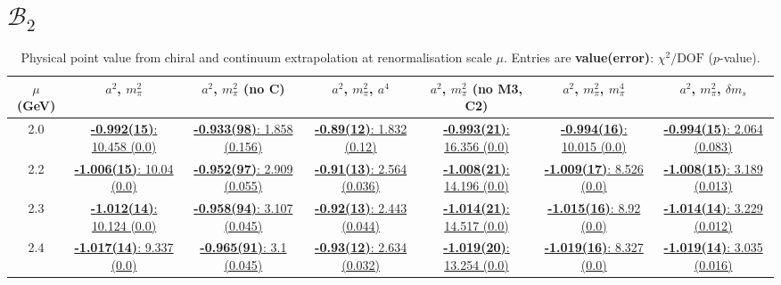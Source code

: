 \documentclass[12pt]{extarticle}
\begin{document}
\section{$\mathcal{B}_2$}
\begin{table}[h!]
\begin{center}
\begin{tabular}{|c|c|c|c|c|c|c|}
\hline
$\mu$ (GeV) & $a^2$, $m_\pi^2$& $a^2$, $m_\pi^2$ (no C)& $a^2$, $m_\pi^2$, $a^4$& $a^2$, $m_\pi^2$ (no M3, C2)& $a^2$, $m_\pi^2$, $m_\pi^4$& $a^2$, $m_\pi^2$, $\delta m_s$\\
\hline
2.0& \hyperlink{VVmAA/NPR/a2m2_20.pdf.1}{\textbf{-0.992(15)}: 10.458 (0.0)} & \hyperlink{VVmAA/NPR/a2m2noC_20.pdf.1}{\textbf{-0.933(98)}: 1.858 (0.156)} & \hyperlink{VVmAA/NPR/a2a4m2_20.pdf.1}{\textbf{-0.89(12)}: 1.832 (0.12)} & \hyperlink{VVmAA/NPR/a2m2mcut_20.pdf.1}{\textbf{-0.993(21)}: 16.356 (0.0)} & \hyperlink{VVmAA/NPR/a2m2m4_20.pdf.1}{\textbf{-0.994(16)}: 10.015 (0.0)} & \hyperlink{VVmAA/NPR/a2m2delm_20.pdf.1}{\textbf{-0.994(15)}: 2.064 (0.083)}\\
2.2& \hyperlink{VVmAA/NPR/a2m2_22.pdf.1}{\textbf{-1.006(15)}: 10.04 (0.0)} & \hyperlink{VVmAA/NPR/a2m2noC_22.pdf.1}{\textbf{-0.952(97)}: 2.909 (0.055)} & \hyperlink{VVmAA/NPR/a2a4m2_22.pdf.1}{\textbf{-0.91(13)}: 2.564 (0.036)} & \hyperlink{VVmAA/NPR/a2m2mcut_22.pdf.1}{\textbf{-1.008(21)}: 14.196 (0.0)} & \hyperlink{VVmAA/NPR/a2m2m4_22.pdf.1}{\textbf{-1.009(17)}: 8.526 (0.0)} & \hyperlink{VVmAA/NPR/a2m2delm_22.pdf.1}{\textbf{-1.008(15)}: 3.189 (0.013)}\\
2.3& \hyperlink{VVmAA/NPR/a2m2_23.pdf.1}{\textbf{-1.012(14)}: 10.124 (0.0)} & \hyperlink{VVmAA/NPR/a2m2noC_23.pdf.1}{\textbf{-0.958(94)}: 3.107 (0.045)} & \hyperlink{VVmAA/NPR/a2a4m2_23.pdf.1}{\textbf{-0.92(13)}: 2.443 (0.044)} & \hyperlink{VVmAA/NPR/a2m2mcut_23.pdf.1}{\textbf{-1.014(21)}: 14.517 (0.0)} & \hyperlink{VVmAA/NPR/a2m2m4_23.pdf.1}{\textbf{-1.015(16)}: 8.92 (0.0)} & \hyperlink{VVmAA/NPR/a2m2delm_23.pdf.1}{\textbf{-1.014(14)}: 3.229 (0.012)}\\
2.4& \hyperlink{VVmAA/NPR/a2m2_24.pdf.1}{\textbf{-1.017(14)}: 9.337 (0.0)} & \hyperlink{VVmAA/NPR/a2m2noC_24.pdf.1}{\textbf{-0.965(91)}: 3.1 (0.045)} & \hyperlink{VVmAA/NPR/a2a4m2_24.pdf.1}{\textbf{-0.93(12)}: 2.634 (0.032)} & \hyperlink{VVmAA/NPR/a2m2mcut_24.pdf.1}{\textbf{-1.019(20)}: 13.254 (0.0)} & \hyperlink{VVmAA/NPR/a2m2m4_24.pdf.1}{\textbf{-1.019(16)}: 8.327 (0.0)} & \hyperlink{VVmAA/NPR/a2m2delm_24.pdf.1}{\textbf{-1.019(14)}: 3.035 (0.016)}\\
\hline
\end{tabular}
\caption{Physical point value from chiral and continuum extrapolation at renormalisation scale $\mu$. Entries are \textbf{value(error)}: $\chi^2/\text{DOF}$ ($p$-value).}
\end{center}
\end{table}
\end{document}
